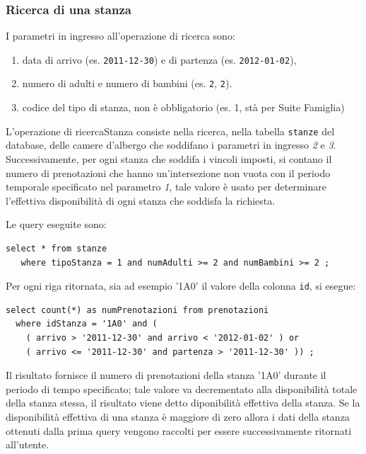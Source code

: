 \documentclass[a4paper]{article}
\begin{document}
\subsubsection{Ricerca di una stanza}
I parametri in ingresso all'operazione di ricerca sono:
\begin{enumerate}
\item data di arrivo (es. \verb+2011-12-30+) e di partenza (es. \verb+2012-01-02+),
\item numero di adulti e numero di bambini (es. \verb+2+, \verb+2+). 
\item codice del tipo di stanza, non \`e obbligatorio (es. 1, st\`a
  per Suite Famiglia)
\end{enumerate}
L'operazione di ricercaStanza consiste nella ricerca, nella tabella
\verb'stanze' del database, delle camere d'albergo che soddifano i
parametri in ingresso \emph{2} e \emph{3}. Successivamente, per ogni
stanza che soddifa i vincoli imposti, si contano il numero di
prenotazioni che hanno un'intersezione non vuota con il periodo
temporale specificato nel parametro \emph{1}, tale valore \`e usato
per determinare l'effettiva disponibilit\`a di ogni stanza che
soddisfa la richiesta.

Le query eseguite sono:
\begin{lstlisting}
select * from stanze 
   where tipoStanza = 1 and numAdulti >= 2 and numBambini >= 2 ; 
\end{lstlisting}
Per ogni riga ritornata, sia ad esempio '1A0' il valore della colonna
\verb+id+, si esegue:
\begin{lstlisting}
select count(*) as numPrenotazioni from prenotazioni 
  where idStanza = '1A0' and (
    ( arrivo > '2011-12-30' and arrivo < '2012-01-02' ) or
    ( arrivo <= '2011-12-30' and partenza > '2011-12-30' )) ;
\end{lstlisting}
Il risultato fornisce il numero di prenotazioni della stanza '1A0'
durante il periodo di tempo specificato; tale valore va decrementato
alla disponibilit\`a totale della stanza stessa, il risultato viene
detto diponibilit\`a effettiva della stanza. Se la disponibilit\`a
effettiva di una stanza \`e maggiore di zero allora i dati della
stanza ottenuti dalla prima query vengono raccolti per essere
successivamente ritornati all'utente.
\end{document}
